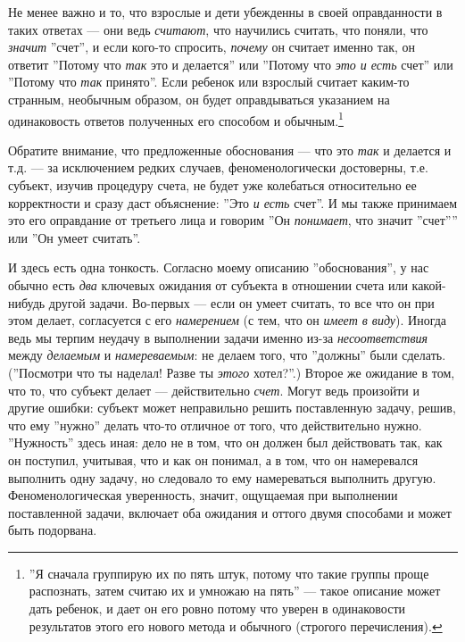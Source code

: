 \documentclass[12pt]{book}
\begin{document}
Не менее важно и то, что взрослые и дети убежденны в своей оправданности в таких ответах --- они ведь \textit{считают}, что научились считать, что поняли, что \textit{значит} ''счет'', и если кого-то спросить, \textit{почему} он считает именно так, он ответит ''Потому что \textit{так} это и делается'' или ''Потому что \textit{это и есть} счет'' или ''Потому что \textit{так} принято''. Если ребенок или взрослый считает каким-то странным, необычным образом, он будет оправдываться указанием на одинаковость ответов полученных его способом и обычным.\footnote{''Я сначала группирую их по пять штук, потому что такие группы проще распознать, затем считаю их и умножаю на пять'' --- такое описание может дать ребенок, и дает он его ровно потому что уверен в одинаковости результатов этого его нового метода и обычного (строгого перечисления).}

Обратите внимание, что предложенные обоснования --- что это \textit{так} и делается и т.д. --- за исключением редких случаев, феноменологически достоверны, т.е. субъект, изучив процедуру счета, не будет уже колебаться относительно ее корректности и сразу даст объяснение: ''Это \textit{и есть} счет''. И мы также принимаем это его оправдание от третьего лица и говорим ''Он \textit{понимает}, что значит ''счет'''' или ''Он умеет считать''.

И здесь есть одна тонкость. Согласно моему описанию ''обоснования'', у нас обычно есть \textit{два} ключевых ожидания от субъекта в отношении счета или какой-нибудь другой задачи. Во-первых --- если он умеет считать, то все что он при этом делает, согласуется с его \textit{намерением} (с тем, что он \textit{имеет в виду}). Иногда ведь мы терпим неудачу в выполнении задачи именно из-за \textit{несоответствия} между \textit{делаемым} и \textit{намереваемым}: не делаем того, что ''должны'' были сделать. (''Посмотри что ты наделал! Разве ты \textit{этого} хотел?''.) Второе же ожидание в том, что то, что субъект делает --- действительно \textit{счет}. Могут ведь произойти и другие ошибки: субъект может неправильно решить поставленную задачу, решив, что ему ''нужно'' делать что-то отличное от того, что действительно нужно. ''Нужность'' здесь иная: дело не в том, что он должен был действовать так, как он поступил, учитывая, что и как он понимал, а в том, что он намеревался выполнить одну задачу, но следовало то ему намереваться выполнить другую. Феноменологическая уверенность, значит, ощущаемая при выполнении поставленной задачи, включает оба ожидания и оттого двумя способами и может быть подорвана.
\end{document}

